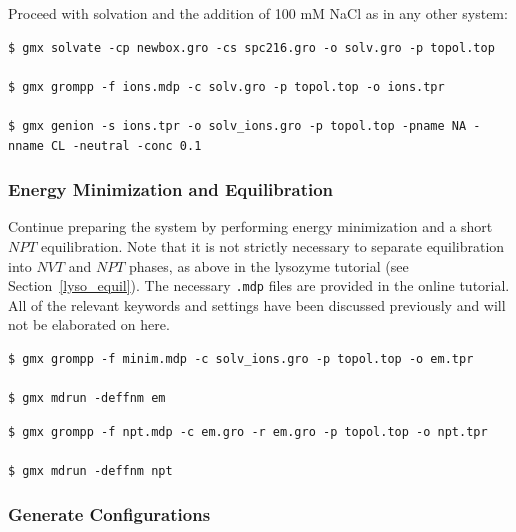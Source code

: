 \documentclass[9pt,tutorial,pubversion]{livecoms}
\begin{document}
Proceed with solvation and the addition of 100 mM NaCl as in any other system:

\begin{lstlisting}
$ gmx solvate -cp newbox.gro -cs spc216.gro -o solv.gro -p topol.top

$ gmx grompp -f ions.mdp -c solv.gro -p topol.top -o ions.tpr

$ gmx genion -s ions.tpr -o solv_ions.gro -p topol.top -pname NA -nname CL -neutral -conc 0.1
\end{lstlisting}

\subsubsection{Energy Minimization and Equilibration} \label{umbrella_equil}

Continue preparing the system by performing energy minimization and a short $NPT$ equilibration. Note that it is not strictly necessary to separate equilibration into $NVT$ and $NPT$ phases, as above in the lysozyme tutorial (see Section~\ref{lyso_equil}). The necessary \texttt{.mdp} files are provided in the online tutorial. All of the relevant keywords and settings have been discussed previously and will not be elaborated on here.

\begin{lstlisting}
$ gmx grompp -f minim.mdp -c solv_ions.gro -p topol.top -o em.tpr

$ gmx mdrun -deffnm em
\end{lstlisting}

\begin{lstlisting}
$ gmx grompp -f npt.mdp -c em.gro -r em.gro -p topol.top -o npt.tpr

$ gmx mdrun -deffnm npt
\end{lstlisting}

\subsubsection{Generate Configurations} \label{umbrella_smd}
\end{document}
